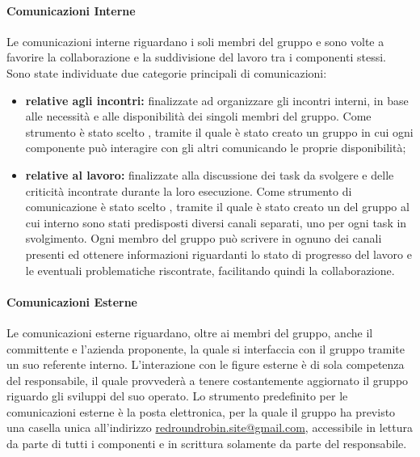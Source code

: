 			\paragraph{Comunicazioni Interne}

				Le comunicazioni interne riguardano i soli membri del gruppo e sono volte a favorire la collaborazione e la suddivisione del lavoro tra i componenti stessi.
				\newline
				Sono state individuate due categorie principali di comunicazioni:

				\begin{itemize}
					\item \textbf{relative agli incontri:} finalizzate ad organizzare gli incontri interni, in base alle necessità e alle disponibilità dei singoli membri del gruppo.
					\newline
					Come strumento è stato scelto , tramite il quale è stato creato un gruppo in cui ogni componente può interagire con gli altri comunicando le proprie disponibilità;
					\item \textbf{relative al lavoro:} finalizzate alla discussione dei task da svolgere e delle criticità incontrate durante la loro esecuzione.
					\newline
					Come strumento di comunicazione è stato scelto , tramite il quale è stato creato un  del gruppo al cui interno sono stati predisposti diversi canali separati, uno per ogni task in svolgimento. Ogni membro del gruppo può scrivere in ognuno dei canali presenti ed ottenere informazioni riguardanti lo stato di progresso del lavoro e le eventuali problematiche riscontrate, facilitando quindi la collaborazione.
				\end{itemize}

			\paragraph{Comunicazioni Esterne}

				Le comunicazioni esterne riguardano, oltre ai membri del gruppo, anche il committente e l'azienda proponente, la quale si interfaccia con il gruppo tramite un suo referente interno. L'interazione con le figure esterne è di sola competenza del responsabile, il quale provvederà a tenere costantemente aggiornato il gruppo riguardo gli sviluppi del suo operato.
				\newline
				Lo strumento predefinito per le comunicazioni esterne è la posta elettronica, per la quale il gruppo ha previsto una casella unica all'indirizzo \href{mailto:redroundrobin.site@gmail.com}{redroundrobin.site@gmail.com}, accessibile in lettura da parte di tutti i componenti e in scrittura solamente da parte del responsabile.

